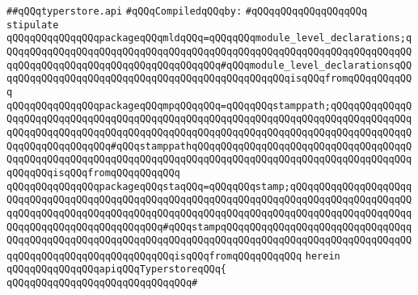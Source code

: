 \label{src/lib/compiler/front/typer-stuff/modules/typerstore.api}
\verb|##qQQqtyperstore.api|\newline
\newline
\verb|#qQQqCompiledqQQqby:|\newline
\verb|#qQQqqQQqqQQqqQQqqQQq|\newline
\newline
\newline
\newline
\verb|stipulate|\newline
\verb|qQQqqQQqqQQqqQQqpackageqQQqmldqQQq=qQQqqQQqmodule_level_declarations;qQQqqQQqqQQqqQQqqQQqqQQqqQQqqQQqqQQqqQQqqQQqqQQqqQQqqQQqqQQqqQQqqQQqqQQqqQQqqQQqqQQqqQQqqQQqqQQqqQQqqQQqqQQq#qQQqmodule_level_declarationsqQQqqQQqqQQqqQQqqQQqqQQqqQQqqQQqqQQqqQQqqQQqqQQqqQQqisqQQqfromqQQqqQQqqQQq|\newline
\verb|qQQqqQQqqQQqqQQqpackageqQQqmpqQQqqQQq=qQQqqQQqstamppath;qQQqqQQqqQQqqQQqqQQqqQQqqQQqqQQqqQQqqQQqqQQqqQQqqQQqqQQqqQQqqQQqqQQqqQQqqQQqqQQqqQQqqQQqqQQqqQQqqQQqqQQqqQQqqQQqqQQqqQQqqQQqqQQqqQQqqQQqqQQqqQQqqQQqqQQqqQQqqQQqqQQqqQQqqQQq#qQQqstamppathqQQqqQQqqQQqqQQqqQQqqQQqqQQqqQQqqQQqqQQqqQQqqQQqqQQqqQQqqQQqqQQqqQQqqQQqqQQqqQQqqQQqqQQqqQQqqQQqqQQqqQQqqQQqqQQqqQQqisqQQqfromqQQqqQQqqQQq|\newline
\verb|qQQqqQQqqQQqqQQqpackageqQQqstaqQQq=qQQqqQQqstamp;qQQqqQQqqQQqqQQqqQQqqQQqqQQqqQQqqQQqqQQqqQQqqQQqqQQqqQQqqQQqqQQqqQQqqQQqqQQqqQQqqQQqqQQqqQQqqQQqqQQqqQQqqQQqqQQqqQQqqQQqqQQqqQQqqQQqqQQqqQQqqQQqqQQqqQQqqQQqqQQqqQQqqQQqqQQqqQQqqQQqqQQqqQQq#qQQqstampqQQqqQQqqQQqqQQqqQQqqQQqqQQqqQQqqQQqqQQqqQQqqQQqqQQqqQQqqQQqqQQqqQQqqQQqqQQqqQQqqQQqqQQqqQQqqQQqqQQqqQQqqQQqqQQqqQQqqQQqqQQqqQQqqQQqisqQQqfromqQQqqQQqqQQq|\newline
\verb|herein|\newline
\newline
\verb|qQQqqQQqqQQqqQQqapiqQQqTyperstoreqQQq{|\newline
\verb|qQQqqQQqqQQqqQQqqQQqqQQqqQQqqQQq#|\newline

